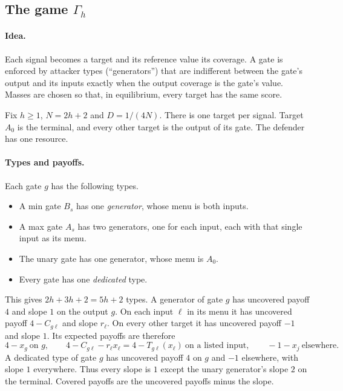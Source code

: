\subsection{The game \texorpdfstring{$\Gamma_h$}{Gamma\_h}}\label{artlck:sec:game}

\paragraph{Idea.} Each signal becomes a target and its reference value its coverage. A gate is enforced
by attacker types (``generators'') that are indifferent between the gate's output and its inputs exactly
when the output coverage is the gate's value. Masses are chosen so that, in equilibrium, every target
has the same score.

Fix $h\ge1$, $N=2h+2$ and $D=1/(4N)$. There is one target per signal. Target $A_0$ is the terminal, and
every other target is the output of its gate. The defender has one resource.

\paragraph{Types and payoffs.} Each gate $g$ has the following types.
\begin{itemize}[nosep]
\item A min gate $B_s$ has one \emph{generator}, whose menu is both inputs.
\item A max gate $A_s$ has two generators, one for each input, each with that single input as its menu.
\item The unary gate has one generator, whose menu is $A_0$.
\item Every gate has one \emph{dedicated} type.
\end{itemize}
This gives $2h+3h+2=5h+2$ types. A generator of gate $g$ has uncovered payoff $4$ and slope $1$ on the
output $g$. On each input $\ell$ in its menu it has uncovered payoff $4-C_{g\ell}$ and slope $r_\ell$. On
every other target it has uncovered payoff $-1$ and slope $1$. Its expected payoffs are therefore
\[
 4-x_g\ \text{on $g$},\qquad 4-C_{g\ell}-r_\ell x_\ell=4-T_{g\ell}(x_\ell)\ \text{on a listed input},\qquad -1-x_j\ \text{elsewhere}.
\]
A dedicated type of gate $g$ has uncovered payoff $4$ on $g$ and $-1$ elsewhere, with slope $1$
everywhere. Thus every slope is $1$ except the unary generator's slope $2$ on the terminal. Covered
payoffs are the uncovered payoffs minus the slope.

